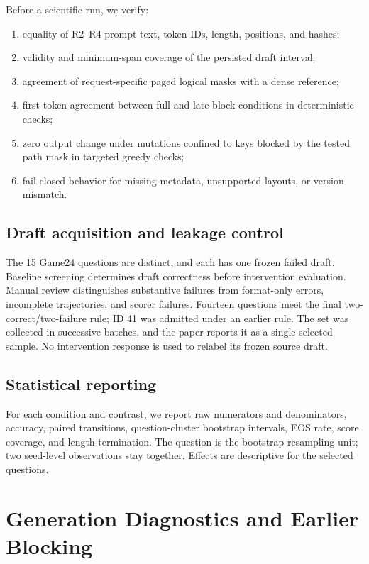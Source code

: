 \documentclass{article}
\begin{document}
Before a scientific run, we verify:
\begin{enumerate}
    \item equality of R2--R4 prompt text, token IDs, length, positions, and hashes;
    \item validity and minimum-span coverage of the persisted draft interval;
    \item agreement of request-specific paged logical masks with a dense reference;
    \item first-token agreement between full and late-block conditions in deterministic checks;
    \item zero output change under mutations confined to keys blocked by the tested path mask in targeted greedy checks;
    \item fail-closed behavior for missing metadata, unsupported layouts, or version mismatch.
\end{enumerate}

\subsection{Draft acquisition and leakage control}

The 15 Game24 questions are distinct, and each has one frozen failed draft. Baseline screening determines draft correctness before intervention evaluation. Manual review distinguishes substantive failures from format-only errors, incomplete trajectories, and scorer failures. Fourteen questions meet the final two-correct/two-failure rule; ID 41 was admitted under an earlier rule. The set was collected in successive batches, and the paper reports it as a single selected sample. No intervention response is used to relabel its frozen source draft.

\subsection{Statistical reporting}

For each condition and contrast, we report raw numerators and denominators, accuracy, paired transitions, question-cluster bootstrap intervals, EOS rate, score coverage, and length termination. The question is the bootstrap resampling unit; two seed-level observations stay together. Effects are descriptive for the selected questions.

\clearpage
\section{Generation Diagnostics and Earlier Blocking}
\label{app:diagnostics}
\end{document}
